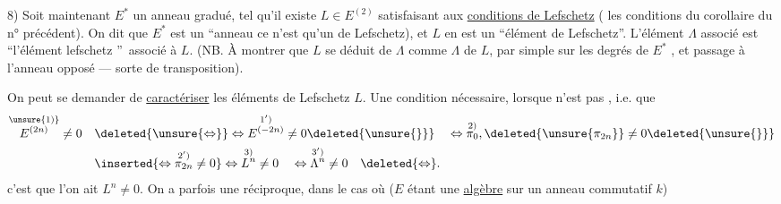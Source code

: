 8) Soit maintenant $E^*$ un anneau gradué,  tel qu'il existe $L\in E^{(2)}$ satisfaisant aux \uline{conditions de Lefschetz} ( les conditions du corollaire du n° précédent). On dit que $E^*$ est un \textquotedblleft anneau   ce n'est  qu'un  de Lefschetz), et $L$ en est un \textquotedblleft élément de Lefschetz\textquotedblright.  L'élément $\Lambda$ associé est  \textquotedblleft l'élément   lefschetz \textquotedblright\ associé à $L$. (NB. À montrer que $L$ se déduit de $\Lambda$ comme $\Lambda$ de $L$, par simple  sur les degrés de $E^*$ \deleted{$\unsure{\gtrless}-$}, et passage à l'anneau opposé --- sorte de  transposition).

On peut se demander de \uline{caractériser} les  éléments de Lefschetz $L$. Une condition nécessaire, lorsque   n'est pas , i.e. que
\[
\begin{aligned}
\overset{\unsure{1)}}{E^{(2n)}}\ne0\quad&\deleted{\unsure{\Leftrightarrow}}\Leftrightarrow\overset{1')}{E^{(-2n)}}\ne0\deleted{\unsure{\}}}
\quad\Leftrightarrow\overset{2)}{\pi_0},\deleted{\unsure{\pi_{2n}}}\ne0\deleted{\unsure{\}}}\\
&\inserted{\Leftrightarrow\overset{2')}{\pi_{2n}}\ne0}
\Leftrightarrow\overset{3)}{L^n}\ne0\quad\Leftrightarrow\overset{3')}{\Lambda^n}\ne0\quad\deleted{\Leftrightarrow}.
\end{aligned}
\]
c'est que l'on ait $L^n\ne0$. On a parfois une réciproque, dans le cas où ($E$ étant une \uline{algèbre} sur un anneau commutatif $k$)
